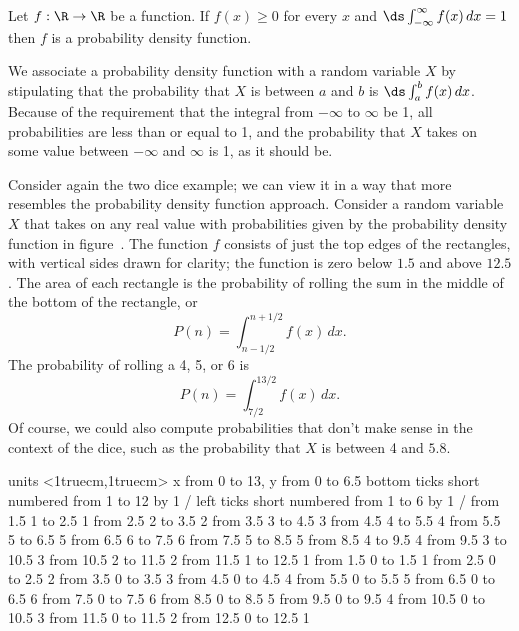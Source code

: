 \begin{definition} Let $f:\R \to \R$ be a
function. If $f(x) \geq 0$ for every $x$ and $\ds\int_{-\infty }
^\infty f(x)\,dx = 1$ then $f$ is a {\dfont probability density
function}.
\end{definition}

We associate a probability density
function with a random variable $X$ by stipulating that the
probability that $X$ is between $a$ and $b$ is 
$\ds\int_a^b f(x)\,dx$. Because of the requirement that the integral
from $-\infty$ to $\infty$ be 1, all probabilities are less than or
equal to 1, and 
the probability that $X$ takes on some value
between $-\infty$ and $\infty$ is 1, as it should be.

\begin{example} Consider again the two dice example; we can view it in a way
that more resembles the probability density function
approach. Consider a random variable $X$ that takes on any real value
with probabilities given by the probability density function in
figure~. The function $f$ consists of just the top
edges of the rectangles, with vertical sides drawn for clarity; the
function is zero below $1.5$ and above $12.5$.
The area of each rectangle is the probability of rolling the sum in
the middle of the bottom of the rectangle, or
$$P(n) = \int_{n-1/2}^{n+1/2} f(x)\,dx.$$
The probability of rolling a 4, 5, or 6 is
$$P(n) = \int_{7/2}^{13/2} f(x)\,dx.$$
Of course, we could also compute probabilities that don't make sense
in the context of the dice, such as the probability that 
$X$ is between 4 and $5.8$.
\end{example}

\figure
\vbox{\beginpicture
\normalgraphs
\ninepoint
\setcoordinatesystem units <1truecm,1truecm>
\setplotarea x from 0 to 13, y from 0 to 6.5
\axis bottom ticks short numbered from 1 to 12 by 1 /
\axis left ticks short numbered from 1 to 6 by 1 /
\putrule from 1.5 1 to 2.5 1
\putrule from 2.5 2 to 3.5 2
\putrule from 3.5 3 to 4.5 3
\putrule from 4.5 4 to 5.5 4
\putrule from 5.5 5 to 6.5 5
\putrule from 6.5 6 to 7.5 6
\putrule from 7.5 5 to 8.5 5
\putrule from 8.5 4 to 9.5 4
\putrule from 9.5 3 to 10.5 3
\putrule from 10.5 2 to 11.5 2
\putrule from 11.5 1 to 12.5 1
\putrule from 1.5   0 to 1.5  1
\putrule from 2.5   0 to 2.5  2
\putrule from 3.5   0 to 3.5  3
\putrule from 4.5   0 to 4.5  4
\putrule from 5.5   0 to 5.5  5
\putrule from 6.5   0 to 6.5  6
\putrule from 7.5   0 to 7.5  6
\putrule from 8.5   0 to 8.5  5
\putrule from 9.5   0 to 9.5  4
\putrule from 10.5  0 to 10.5 3
\putrule from 11.5  0 to 11.5 2
\putrule from 12.5  0 to 12.5 1
\endpicture}

